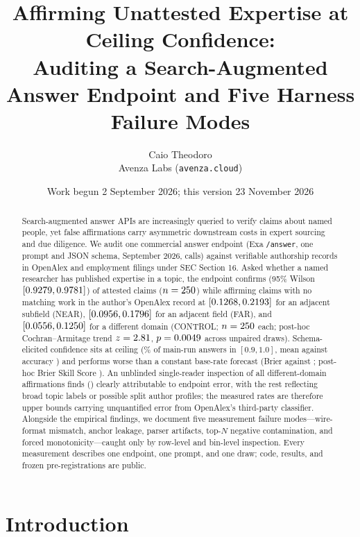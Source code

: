 \documentclass[11pt]{article}
\title{Affirming Unattested Expertise at Ceiling Confidence:\\
Auditing a Search-Augmented Answer Endpoint and Five Harness Failure Modes}
\author{Caio Theodoro\\\small Avenza Labs (\texttt{avenza.cloud})}
\date{Work begun 2 September 2026; this version 23 November 2026}
\begin{document}
\maketitle

\begin{abstract}
\noindent
Search-augmented answer APIs are increasingly queried to verify claims about named people, yet false affirmations carry asymmetric downstream costs in expert sourcing and due diligence. We audit one commercial answer endpoint (Exa \texttt{/answer}, one prompt and JSON schema, September 2026, \tiTotalCalls{} calls) against verifiable authorship records in OpenAlex and employment filings under SEC Section 16. Asked whether a named researcher has published expertise in a topic, the endpoint confirms \tiAttRate{} (95\% Wilson $[0.9279{},0.9781{}]$) of attested claims ($n=250{}$) while affirming claims with no matching work in the author's OpenAlex record at \tiNearRate{} $[0.1268{},0.2193{}]$ for an adjacent subfield (NEAR), \tiFarRate{} $[0.0956{},0.1796{}]$ for an adjacent field (FAR), and \tiCtlRate{} $[0.0556{},0.1250{}]$ for a different domain (CONTROL; $n=250{}$ each; post-hoc Cochran--Armitage trend $z=2.81{}$, $p=0.0049{}$ across unpaired draws). Schema-elicited confidence sits at ceiling (\tiCalTopShare{}\% of main-run answers in $[0.9, 1.0]$, mean \tiCalTopConf{} against accuracy \tiCalTopAcc{}) and performs worse than a constant base-rate forecast (Brier \tiBrier{} against \tiBrierBase{}; post-hoc Brier Skill Score \tiPostMainBss{}). An unblinded single-reader inspection of all \tiCtlK{} different-domain affirmations finds \tiRdOther{} (\tiRdErrRate{}) clearly attributable to endpoint error, with the rest reflecting broad topic labels or possible split author profiles; the measured rates are therefore upper bounds carrying unquantified error from OpenAlex's third-party classifier. Alongside the empirical findings, we document five measurement failure modes---wire-format mismatch, anchor leakage, parser artifacts, top-$N$ negative contamination, and forced monotonicity---caught only by row-level and bin-level inspection. Every measurement describes one endpoint, one prompt, and one draw; code, results, and frozen pre-registrations are public.
\end{abstract}

\section{Introduction}
\label{sec:intro}
\end{document}
